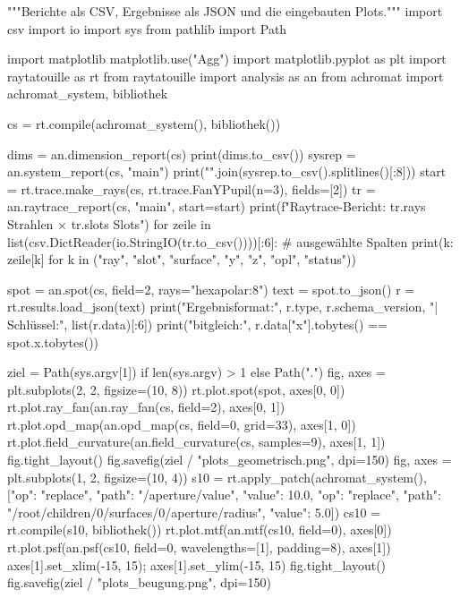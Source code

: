 \documentclass[11pt,a4paper,openany]{book}
\DeclareRobustCommand{\code}[1]{\texttt{\directlua{rttcode("\luaescapestring{\detokenize{#1}}")}}}
\begin{document}
\begin{pycode}[title={\code{ex16_berichte.py}}]
"""Berichte als CSV, Ergebnisse als JSON und die eingebauten Plots."""
import csv
import io
import sys
from pathlib import Path

import matplotlib
matplotlib.use("Agg")
import matplotlib.pyplot as plt
import raytatouille as rt
from raytatouille import analysis as an
from achromat import achromat_system, bibliothek

cs = rt.compile(achromat_system(), bibliothek())

dims = an.dimension_report(cs)
print(dims.to_csv())
sysrep = an.system_report(cs, "main")
print("\n".join(sysrep.to_csv().splitlines()[:8]))
start = rt.trace.make_rays(cs, rt.trace.FanYPupil(n=3), fields=[2])
tr = an.raytrace_report(cs, "main", start=start)
print(f"Raytrace-Bericht: {tr.rays} Strahlen × {tr.slots} Slots")
for zeile in list(csv.DictReader(io.StringIO(tr.to_csv())))[:6]:     # ausgewählte Spalten
    print({k: zeile[k] for k in ("ray", "slot", "surface", "y", "z", "opl", "status")})

spot = an.spot(cs, field=2, rays="hexapolar:8")
text = spot.to_json()
r = rt.results.load_json(text)
print("Ergebnisformat:", r.type, r.schema_version, "| Schlüssel:", list(r.data)[:6])
print("bitgleich:", r.data["x"].tobytes() == spot.x.tobytes())

ziel = Path(sys.argv[1]) if len(sys.argv) > 1 else Path(".")
fig, axes = plt.subplots(2, 2, figsize=(10, 8))
rt.plot.spot(spot, axes[0, 0])
rt.plot.ray_fan(an.ray_fan(cs, field=2), axes[0, 1])
rt.plot.opd_map(an.opd_map(cs, field=0, grid=33), axes[1, 0])
rt.plot.field_curvature(an.field_curvature(cs, samples=9), axes[1, 1])
fig.tight_layout()
fig.savefig(ziel / "plots_geometrisch.png", dpi=150)
fig, axes = plt.subplots(1, 2, figsize=(10, 4))
s10 = rt.apply_patch(achromat_system(), [{"op": "replace", "path": "/aperture/value", "value": 10.0},
    {"op": "replace", "path": "/root/children/0/surfaces/0/aperture/radius", "value": 5.0}])
cs10 = rt.compile(s10, bibliothek())
rt.plot.mtf(an.mtf(cs10, field=0), axes[0])
rt.plot.psf(an.psf(cs10, field=0, wavelengths=[1], padding=8), axes[1])
axes[1].set_xlim(-15, 15); axes[1].set_ylim(-15, 15)
fig.tight_layout()
fig.savefig(ziel / "plots_beugung.png", dpi=150)
\end{pycode}
\end{document}

